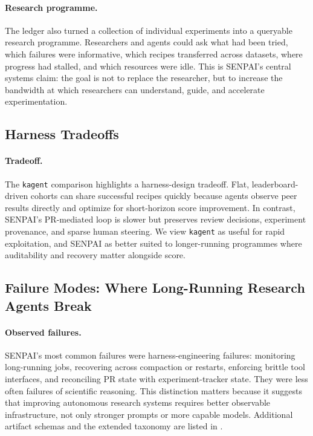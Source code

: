 \documentclass{article}
\begin{document}
\paragraph{Research programme.}
The ledger also turned a collection of individual experiments into a queryable research programme. Researchers and agents could ask what had been tried, which failures were informative, which recipes transferred across datasets, where progress had stalled, and which resources were idle. This is SENPAI's central systems claim: the goal is not to replace the researcher, but to increase the bandwidth at which researchers can understand, guide, and accelerate experimentation.

\subsection{Harness Tradeoffs}

\paragraph{Tradeoff.}
The \texttt{kagent} comparison highlights a harness-design tradeoff. Flat, leaderboard-driven cohorts can share successful recipes quickly because agents observe peer results directly and optimize for short-horizon score improvement. In contrast, SENPAI's PR-mediated loop is slower but preserves review decisions, experiment provenance, and sparse human steering. We view \texttt{kagent} as useful for rapid exploitation, and SENPAI as better suited to longer-running programmes where auditability and recovery matter alongside score.

\subsection{Failure Modes: Where Long-Running Research Agents Break}

\paragraph{Observed failures.}
SENPAI's most common failures were harness-engineering failures: monitoring long-running jobs, recovering across compaction or restarts, enforcing brittle tool interfaces, and reconciling PR state with experiment-tracker state. They were less often failures of scientific reasoning. This distinction matters because it suggests that improving autonomous research systems requires better observable infrastructure, not only stronger prompts or more capable models. Additional artifact schemas and the extended taxonomy are listed in .
\end{document}
